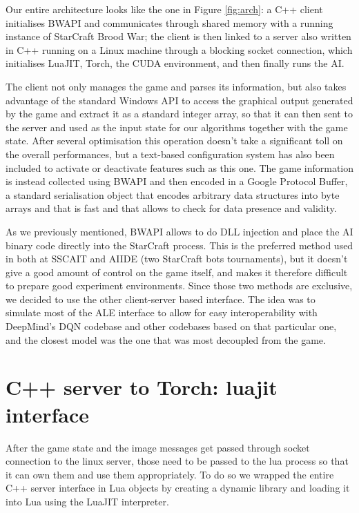 \documentclass[bsc,frontabs,twoside,parskip,deptreport]{infthesis}     %
\begin{document}
Our entire architecture looks like the one in Figure \ref{fig:arch}: a C++
client initialises BWAPI and communicates through shared memory with a running
instance of StarCraft Brood War; the client is then linked to a server also
written in C++ running on a Linux machine through a blocking socket connection,
which initialises LuaJIT\cite{pall2008luajit}, Torch\cite{collobert2011torch},
the CUDA environment\cite{nvidia2008programming}, and then finally runs the AI.

The client not only manages the game and parses its information, but also takes
advantage of the standard Windows API to access the graphical output generated
by the game and extract it as a standard integer array, so that it can then sent
to the server and used as the input state for our algorithms together with the
game state. After several optimisation this operation doesn't take a significant
toll on the overall performances, but a text-based configuration system has also
been included to activate or deactivate features such as this one. The game
information is instead collected using BWAPI and then encoded in a Google
Protocol Buffer\cite{protobuf}, a standard serialisation object that encodes
arbitrary data structures into byte arrays and that is fast and that allows to
check for data presence and validity.

As we previously mentioned, BWAPI allows to do DLL injection and place the AI
binary code directly into the StarCraft process. This is the preferred method
used in both at SSCAIT and AIIDE (two StarCraft bots tournaments), but it
doesn't give a good amount of control on the game itself, and makes it therefore
difficult to prepare good experiment environments. Since those two methods are
exclusive, we decided to use the other client-server based interface. The idea
was to simulate most of the ALE interface to allow for easy interoperability
with DeepMind's DQN codebase and other codebases based on that particular one,
and the closest model was the one that was most decoupled from the game.

\section{C++ server to Torch: luajit interface}

After the game state and the image messages get passed through socket connection
to the linux server, those need to be passed to the lua process so that it can
own them and use them appropriately. To do so we wrapped the entire C++ server
interface in Lua objects by creating a dynamic library and loading it into Lua
using the LuaJIT interpreter.
\end{document}
